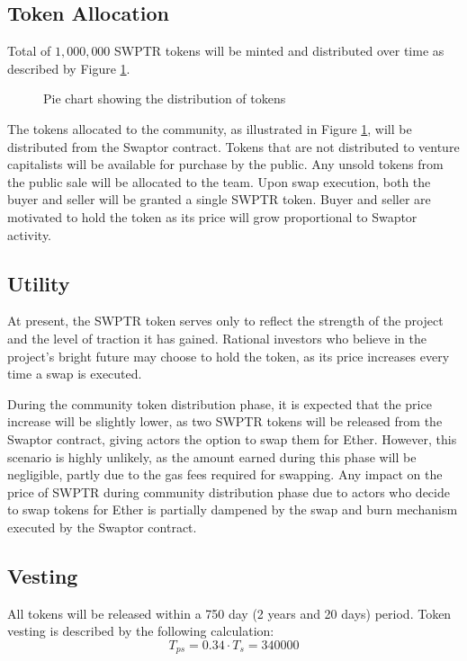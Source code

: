 \documentclass[12pt]{article}
\begin{document}
  \subsection{Token Allocation}

  Total of $1,000,000$ SWPTR tokens will be minted and distributed over time as described by Figure \ref{fig:pie-chart}.

  \begin{figure}[h]
    \centering
    \caption{Pie chart showing the distribution of tokens}
    \label{fig:pie-chart}
  \end{figure}

  The tokens allocated to the community, as illustrated in Figure \ref{fig:pie-chart}, will be distributed from the Swaptor contract.
  Tokens that are not distributed to venture capitalists will be available for purchase by the public. Any unsold tokens from the public sale will be allocated to the team.
  Upon swap execution, both the buyer and seller will be granted a single SWPTR token.
  Buyer and seller are motivated to hold the token as its price will grow proportional to Swaptor activity.

  \newpage

  \subsection{Utility}
  At present, the SWPTR token serves only to reflect the strength of the
  project and the level of traction it has gained. Rational investors
  who believe in the project's bright future may choose to hold the
  token, as its price increases every time a swap is executed.

  During the community token distribution phase, it is expected that
  the price increase will be slightly lower, as two SWPTR tokens will
  be released from the Swaptor contract, giving actors the option to swap
  them for Ether. However, this scenario is highly unlikely, as the
  amount earned during this phase will be negligible, partly due to
  the gas fees required for swapping. Any impact on the price of SWPTR during
  community distribution phase due to actors who decide to swap tokens
  for Ether is partially dampened by the swap and burn mechanism executed
  by the Swaptor contract.

  \subsection{Vesting}
  All tokens will be released within a 750 day (2 years and 20 days) period.
  Token vesting is described by the following calculation:
  \begin{equation}
    T_{ps} = 0.34 \cdot T_{s} = 340000
  \end{equation}
\end{document}
